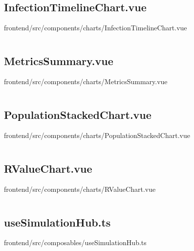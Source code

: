 \makeatletter
\subsection*{InfectionTimelineChart.vue}
frontend/src/components/charts/InfectionTimelineChart.vue
\def\@currentlabelname{InfectionTimelineChart.vue}
\label{code:frontend:src:components:charts:InfectionTimelineChart.vue}
\makeatother

\inputminted[linenos,breaklines,tabsize=2]{vue}{/Users/Henry/Desktop/NEAComputerScience/frontend/src/components/charts/InfectionTimelineChart.vue}

\makeatletter
\subsection*{MetricsSummary.vue}
frontend/src/components/charts/MetricsSummary.vue
\def\@currentlabelname{MetricsSummary.vue}
\label{code:frontend:src:components:charts:MetricsSummary.vue}
\makeatother

\inputminted[linenos,breaklines,tabsize=2]{vue}{/Users/Henry/Desktop/NEAComputerScience/frontend/src/components/charts/MetricsSummary.vue}

\makeatletter
\subsection*{PopulationStackedChart.vue}
frontend/src/components/charts/PopulationStackedChart.vue
\def\@currentlabelname{PopulationStackedChart.vue}
\label{code:frontend:src:components:charts:PopulationStackedChart.vue}
\makeatother

\inputminted[linenos,breaklines,tabsize=2]{vue}{/Users/Henry/Desktop/NEAComputerScience/frontend/src/components/charts/PopulationStackedChart.vue}

\makeatletter
\subsection*{RValueChart.vue}
frontend/src/components/charts/RValueChart.vue
\def\@currentlabelname{RValueChart.vue}
\label{code:frontend:src:components:charts:RValueChart.vue}
\makeatother

\inputminted[linenos,breaklines,tabsize=2]{vue}{/Users/Henry/Desktop/NEAComputerScience/frontend/src/components/charts/RValueChart.vue}

\makeatletter
\subsection*{useSimulationHub.ts}
frontend/src/composables/useSimulationHub.ts
\def\@currentlabelname{useSimulationHub.ts}
\label{code:frontend:src:composables:useSimulationHub.ts}
\makeatother

